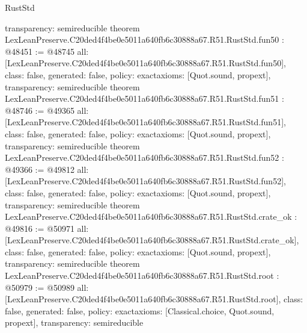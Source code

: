 \begin{lexlean}{RustStd}
\begin{coremodule}
{  transparency: semireducible
}
theorem LexLeanPreserve.C20ded4f4be0e5011a640fb6c30888a67.R51.RustStd.fun50 : @48451 := @48745 {
  all: [LexLeanPreserve.C20ded4f4be0e5011a640fb6c30888a67.R51.RustStd.fun50],
  class: false,
  generated: false,
  policy: exact{axioms: [Quot.sound, propext]},
  transparency: semireducible
}
theorem LexLeanPreserve.C20ded4f4be0e5011a640fb6c30888a67.R51.RustStd.fun51 : @48746 := @49365 {
  all: [LexLeanPreserve.C20ded4f4be0e5011a640fb6c30888a67.R51.RustStd.fun51],
  class: false,
  generated: false,
  policy: exact{axioms: [Quot.sound, propext]},
  transparency: semireducible
}
theorem LexLeanPreserve.C20ded4f4be0e5011a640fb6c30888a67.R51.RustStd.fun52 : @49366 := @49812 {
  all: [LexLeanPreserve.C20ded4f4be0e5011a640fb6c30888a67.R51.RustStd.fun52],
  class: false,
  generated: false,
  policy: exact{axioms: [Quot.sound, propext]},
  transparency: semireducible
}
theorem LexLeanPreserve.C20ded4f4be0e5011a640fb6c30888a67.R51.RustStd.crate_ok : @49816 := @50971 {
  all: [LexLeanPreserve.C20ded4f4be0e5011a640fb6c30888a67.R51.RustStd.crate_ok],
  class: false,
  generated: false,
  policy: exact{axioms: [Quot.sound, propext]},
  transparency: semireducible
}
theorem LexLeanPreserve.C20ded4f4be0e5011a640fb6c30888a67.R51.RustStd.root : @50979 := @50989 {
  all: [LexLeanPreserve.C20ded4f4be0e5011a640fb6c30888a67.R51.RustStd.root],
  class: false,
  generated: false,
  policy: exact{axioms: [Classical.choice, Quot.sound, propext]},
  transparency: semireducible
}


\end{coremodule}
\end{lexlean}
